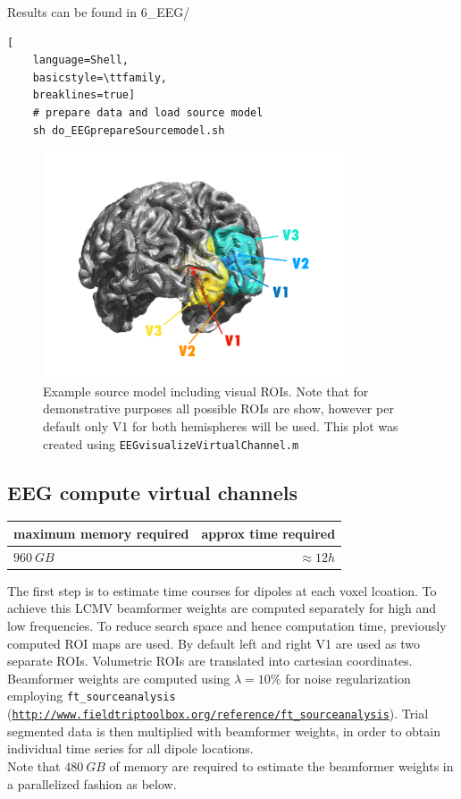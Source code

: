 \documentclass[12pt,a4paper]{scrartcl}
\begin{document}
\noindent Results can be found in 6\_EEG/\\
\begin{lstlisting}[
    language=Shell,
    basicstyle=\ttfamily,
    breaklines=true]
    # prepare data and load source model
    sh do_EEGprepareSourcemodel.sh
\end{lstlisting}
\begin{figure}
\begin{center}
\includegraphics[width=0.8\textwidth]{exampleSourcemodel}
\caption[Example source model]{Example source model including visual ROIs. Note that for demonstrative purposes all possible ROIs are show, however per default only V1 for both hemispheres will be used. This plot was created using \texttt{EEGvisualizeVirtualChannel.m}}
\label{fig:exampleSourcemodel}
\end{center}
\end{figure}
\FloatBarrier
\subsection{EEG compute virtual channels}

\begin{table}[h]
\begin{tabular}{l | r}
\toprule
maximum memory required & approx time required\\\toprule
$960~GB$ & $\approx 12h$ \\\bottomrule
\end{tabular}
\end{table}
The first step is to estimate time courses for dipoles at each voxel lcoation. To achieve this LCMV beamformer weights are computed separately for high and low frequencies. To reduce search space and hence computation time, previously computed ROI maps are used. By default left and right V1 are used as two separate ROIs. Volumetric ROIs are translated into cartesian coordinates. Beamformer weights are computed using \texttt{$\lambda=10\%$} for noise regularization employing \texttt{ft\_sourceanalysis} (\href{http://www.fieldtriptoolbox.org/reference/ft\_sourceanalysis}{\nolinkurl{http://www.fieldtriptoolbox.org/reference/ft\_sourceanalysis}}). Trial segmented data is then multiplied with beamformer weights, in order to obtain individual time series for all dipole locations.\\
Note that $480~GB$ of memory are required to estimate the beamformer weights in a parallelized fashion as below.\\
\end{document}
